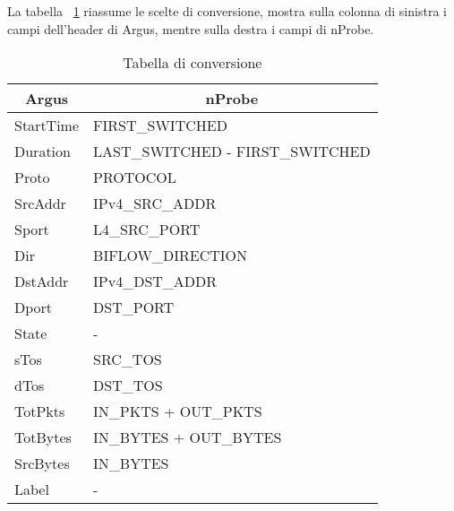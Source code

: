 \documentclass[../main.tex]{subfiles}
\begin{document}
La tabella ~\ref{table:tabellaConversione} riassume le scelte di conversione, mostra sulla colonna di sinistra i campi dell'header di Argus, mentre sulla destra i campi di nProbe. 
				\begin{table}[]
								\centering
								\begin{tabular}{|l|l|}
												\hline
												\multicolumn{1}{|c|}{\textbf{Argus}} & \multicolumn{1}{c|}{\textbf{nProbe}} \\ \hline
												StartTime                            & FIRST\_SWITCHED                      \\ \hline
												Duration                             & LAST\_SWITCHED - FIRST\_SWITCHED     \\ \hline
												Proto                                & PROTOCOL                             \\ \hline
												SrcAddr                              & IPv4\_SRC\_ADDR                      \\ \hline
												Sport                                & L4\_SRC\_PORT                        \\ \hline
												Dir                                  & BIFLOW\_DIRECTION                    \\ \hline
												DstAddr                              & IPv4\_DST\_ADDR                      \\ \hline
												Dport                                & DST\_PORT                            \\ \hline
												State                                & -                                    \\ \hline
												sTos                                 & SRC\_TOS                             \\ \hline
												dTos                                 & DST\_TOS                             \\ \hline
												TotPkts                              & IN\_PKTS + OUT\_PKTS                 \\ \hline
												TotBytes                             & IN\_BYTES + OUT\_BYTES               \\ \hline
												SrcBytes                             & IN\_BYTES                            \\ \hline
												Label                                & -                                    \\ \hline
								\end{tabular}
				\caption{Tabella di conversione}
								\label{table:tabellaConversione}
\end{table}
\end{document}
